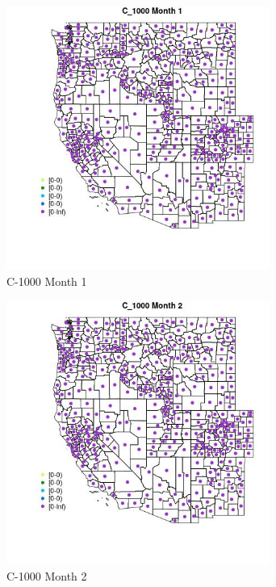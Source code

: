 \begin{figure} 
\centering  
\includegraphics[width=0.77\textwidth]{Code_Outputs/df_report_ML_predictors_CountyCentroid_Locations_Dates_2008-01-01to2018-12-31_MapObsMo1C_1000.jpg} 
\caption{\label{fig:df_report_ML_predictors_CountyCentroid_Locations_Dates_2008-01-01to2018-12-31MapObsMo1C_1000}C-1000 Month 1} 
\end{figure} 
 

\clearpage 

\begin{figure} 
\centering  
\includegraphics[width=0.77\textwidth]{Code_Outputs/df_report_ML_predictors_CountyCentroid_Locations_Dates_2008-01-01to2018-12-31_MapObsMo2C_1000.jpg} 
\caption{\label{fig:df_report_ML_predictors_CountyCentroid_Locations_Dates_2008-01-01to2018-12-31MapObsMo2C_1000}C-1000 Month 2} 
\end{figure} 
 

